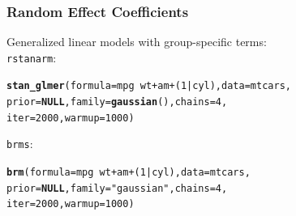 \documentclass[handout]{beamer}\usepackage[]{graphicx}\usepackage[]{color}
\makeatletter
\newcommand{\hlnum}[1]{\textcolor[rgb]{0.686,0.059,0.569}{#1}}%
\newcommand{\hlstr}[1]{\textcolor[rgb]{0.192,0.494,0.8}{#1}}%
\newcommand{\hlopt}[1]{\textcolor[rgb]{0,0,0}{#1}}%
\newcommand{\hlstd}[1]{\textcolor[rgb]{0.345,0.345,0.345}{#1}}%
\newcommand{\hlkwa}[1]{\textcolor[rgb]{0.161,0.373,0.58}{\textbf{#1}}}%
\newcommand{\hlkwc}[1]{\textcolor[rgb]{0.333,0.667,0.333}{#1}}%
\newcommand{\hlkwd}[1]{\textcolor[rgb]{0.737,0.353,0.396}{\textbf{#1}}}%
\newenvironment{kframe}{%
 \def\at@end@of@kframe{}%
 \ifinner\ifhmode%
  \def\at@end@of@kframe{\end{minipage}}%
  \begin{minipage}{\columnwidth}%
 \fi\fi%
 \def\FrameCommand##1{\hskip\@totalleftmargin \hskip-\fboxsep
 \colorbox{shadecolor}{##1}\hskip-\fboxsep
     \hskip-\linewidth \hskip-\@totalleftmargin \hskip\columnwidth}%
 \MakeFramed {\advance\hsize-\width
   \@totalleftmargin\z@ \linewidth\hsize
   \@setminipage}}%
 {\par\unskip\endMakeFramed%
 \at@end@of@kframe}
\newenvironment{knitrout}{}{} %
\makeatother
\begin{document}
\begin{frame}[fragile]
\frametitle{Random Effect Coefficients}
Generalized linear models with group-specific terms: \\

\texttt{rstanarm}: \\

\begin{knitrout}
\color{fgcolor}\begin{kframe}
\begin{alltt}
\hlkwd{stan_glmer}\hlstd{(}\hlkwc{formula} \hlstd{= mpg} \hlopt{~} \hlstd{wt} \hlopt{+} \hlstd{am} \hlopt{+} \hlstd{(}\hlnum{1}\hlopt{|}\hlstd{cyl),} \hlkwc{data} \hlstd{= mtcars,}
           \hlkwc{prior} \hlstd{=} \hlkwa{NULL}\hlstd{,} \hlkwc{family} \hlstd{=} \hlkwd{gaussian}\hlstd{(),} \hlkwc{chains}\hlstd{=}\hlnum{4}\hlstd{,}
           \hlkwc{iter}\hlstd{=}\hlnum{2000}\hlstd{,} \hlkwc{warmup}\hlstd{=}\hlnum{1000}\hlstd{)}
\end{alltt}
\end{kframe}
\end{knitrout}

\texttt{brms}: \\

\begin{knitrout}
\color{fgcolor}\begin{kframe}
\begin{alltt}
\hlkwd{brm}\hlstd{(}\hlkwc{formula} \hlstd{= mpg} \hlopt{~} \hlstd{wt} \hlopt{+} \hlstd{am} \hlopt{+} \hlstd{(}\hlnum{1}\hlopt{|}\hlstd{cyl),} \hlkwc{data} \hlstd{= mtcars,}
    \hlkwc{prior} \hlstd{=} \hlkwa{NULL}\hlstd{,} \hlkwc{family}\hlstd{=}\hlstr{"gaussian"}\hlstd{,} \hlkwc{chains}\hlstd{=}\hlnum{4}\hlstd{,}
    \hlkwc{iter}\hlstd{=}\hlnum{2000}\hlstd{,} \hlkwc{warmup}\hlstd{=}\hlnum{1000}\hlstd{)}
\end{alltt}
\end{kframe}
\end{knitrout}

\end{frame}

\end{document}
